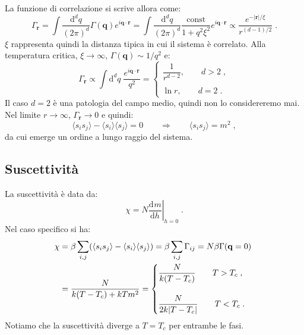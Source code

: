 \documentclass[10pt,a4paper]{report}
\theoremstyle{definition}
\newcommand{\dev}[3][]{\frac{\mathrm{d}^{#1} #2}{\mathrm{d} #3^{#1}}}
\numberwithin{equation}{section}
\newcommand{\diff}[1][]{\mathrm{d}#1}
\newcommand{\bra}{\langle}
\newcommand{\ket}{\rangle}
\begin{document}
La funzione di correlazione si scrive allora come:
\begin{equation}
\Gamma_{\mathbf{r}}=\int\frac{\diff^d{q}}{(2\pi)^d}\Gamma(\mathbf{q})e^{i\mathbf{q}\cdot\mathbf{r}}=\int\frac{\diff^d{q}}{(2\pi)^d}\frac{\mathrm{const}}{1+q^2\xi^2}e^{i\mathbf{q}\cdot\mathbf{r}}\propto \frac{e^{-|\mathbf{r}|/\xi}}{r^{(d-1)/2}}\;.
\end{equation}
$\xi$ rappresenta quindi la distanza tipica in cui il sistema è correlato. Alla temperatura critica, $\xi\to\infty$, $\Gamma(\mathbf{q})\sim 1/q^2$ e:
$$
\Gamma_{\mathbf{r}}\propto\int \diff^d{q}\;\frac{e^{i\mathbf{q}\cdot\mathbf{r}}}{q^2}=\begin{cases}
\dfrac{1}{r^{d-2}},\qquad d>2\;, \\
\\
\ln r,\qquad d=2\;.
\end{cases}
$$
Il caso $d=2$ è una patologia del campo medio, quindi non lo considereremo mai. Nel limite $r\to\infty$, $\Gamma_{\mathbf{r}}\to 0$ e quindi:
$$
\bra s_is_j\ket-\bra s_i\ket\bra s_j\ket=0\qquad \Longrightarrow\qquad \bra s_is_j\ket=m^2\;,
$$
da cui emerge un ordine a lungo raggio del sistema.
\subsection{Suscettività}
La suscettività è data da:
$$
\chi=N\left.\dev{m}{h}\right|_{h=0}\;.
$$
Nel caso specifico si ha:
\begin{align}
\chi &=\beta\sum_{i,j}(\bra s_is_j\ket-\bra s_i\ket\bra s_j\ket)=\beta\sum_{i,j}\Gamma_{ij}=N\beta\Gamma(\mathbf{q}=0) \notag \\
&=\frac{N}{k(T-T_c)+kTm^2}=\begin{cases}
\dfrac{N}{k(T-T_c)}\qquad T>T_c\;, \\
\\
\dfrac{N}{2k|T-T_c|}\qquad T<T_c\;.
\end{cases}
\end{align}
Notiamo che la suscettività diverge a $T=T_c$ per entrambe le fasi.
\end{document}

